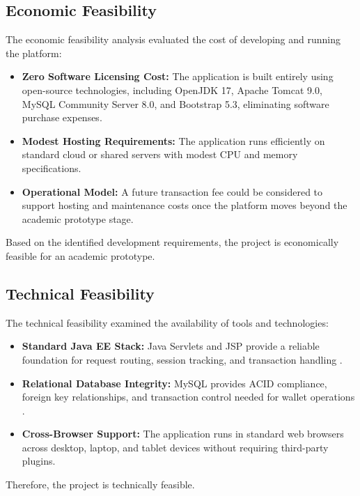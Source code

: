 \documentclass[12pt,a4paper]{report}
\begin{document}
\subsection{Economic Feasibility}
The economic feasibility analysis evaluated the cost of developing and running the platform:
\begin{itemize}[leftmargin=1.5em, itemsep=2pt]
  \item \textbf{Zero Software Licensing Cost:} The application is built entirely using open-source technologies, including OpenJDK 17, Apache Tomcat 9.0, MySQL Community Server 8.0, and Bootstrap 5.3, eliminating software purchase expenses.
  \item \textbf{Modest Hosting Requirements:} The application runs efficiently on standard cloud or shared servers with modest CPU and memory specifications.
  \item \textbf{Operational Model:} A future transaction fee could be considered to support hosting and maintenance costs once the platform moves beyond the academic prototype stage.
\end{itemize}
Based on the identified development requirements, the project is economically feasible for an academic prototype.

\subsection{Technical Feasibility}
The technical feasibility examined the availability of tools and technologies:
\begin{itemize}[leftmargin=1.5em, itemsep=2pt]
  \item \textbf{Standard Java EE Stack:} Java Servlets and JSP provide a reliable foundation for request routing, session tracking, and transaction handling \cite{oracleservlets, oraclejsp}.
  \item \textbf{Relational Database Integrity:} MySQL provides ACID compliance, foreign key relationships, and transaction control needed for wallet operations \cite{mysqlref}.
  \item \textbf{Cross-Browser Support:} The application runs in standard web browsers across desktop, laptop, and tablet devices without requiring third-party plugins.
\end{itemize}
Therefore, the project is technically feasible.
\end{document}
